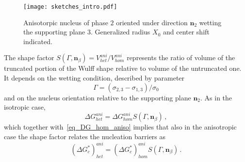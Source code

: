     \begin{figure}
        \centering
        \texttt{[image: sketches\_intro.pdf]}
        \caption{Anisotorpic nucleus of phase $\mathit{2}$ oriented under direction $\bm{n}_\mathit{2}$ wetting the supporting plane $\mathit{3}$. Generalized radius $X_0$ and center shift indicated.}
        \label{fig:my_label}
    \end{figure}
    
    The shape factor $S(\Gamma,\bm{n}_\beta)=V_{het}^{ani}/V_{hom}^{ani}$ represents the ratio of volume of the truncated portion of the Wulff shape relative to volume of the untruncated one. It depends on the wetting condition, described by parameter
    \begin{equation}
        \Gamma=(\sigma_{2,3}-\sigma_{1,3})/\sigma_{0}
    \end{equation}
    and on the nucleus orientation relative to the supporting plane $\bm{n}_\mathit{2}$. As in the isotropic case, 
    \begin{equation}
        \Delta G_{het}^{ani} = \Delta G_{hom}^{ani} S(\Gamma,\bm{n}_\beta) \,,
    \end{equation}
    which together with~\eqref{eq_DG_hom_aniso} implies that also in the anisotropic case the shape factor relates the nucleation barriers as
    \begin{equation}
        (\Delta G^*_c)_{het}^{ani} = (\Delta G^*_c)_{hom}^{ani} S(\Gamma,\bm{n}_\beta) \,.
    \end{equation}
    
    
    
